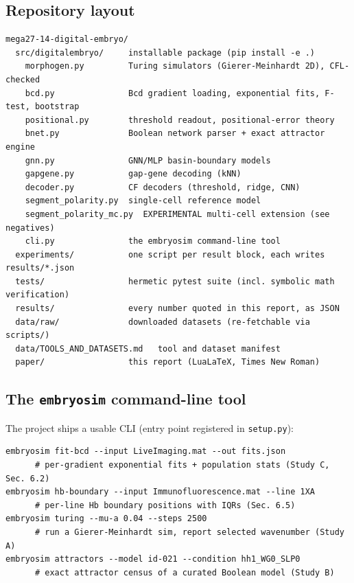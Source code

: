 \label{sec:repro}

\subsection{Repository layout}

\begin{verbatim}
mega27-14-digital-embryo/
  src/digitalembryo/     installable package (pip install -e .)
    morphogen.py         Turing simulators (Gierer-Meinhardt 2D), CFL-checked
    bcd.py               Bcd gradient loading, exponential fits, F-test, bootstrap
    positional.py        threshold readout, positional-error theory
    bnet.py              Boolean network parser + exact attractor engine
    gnn.py               GNN/MLP basin-boundary models
    gapgene.py           gap-gene decoding (kNN)
    decoder.py           CF decoders (threshold, ridge, CNN)
    segment_polarity.py  single-cell reference model
    segment_polarity_mc.py  EXPERIMENTAL multi-cell extension (see negatives)
    cli.py               the embryosim command-line tool
  experiments/           one script per result block, each writes results/*.json
  tests/                 hermetic pytest suite (incl. symbolic math verification)
  results/               every number quoted in this report, as JSON
  data/raw/              downloaded datasets (re-fetchable via scripts/)
  data/TOOLS_AND_DATASETS.md   tool and dataset manifest
  paper/                 this report (LuaLaTeX, Times New Roman)
\end{verbatim}

\subsection{The \texttt{embryosim} command-line tool}

The project ships a usable CLI (entry point registered in \texttt{setup.py}):

\begin{verbatim}
embryosim fit-bcd --input LiveImaging.mat --out fits.json
      # per-gradient exponential fits + population stats (Study C, Sec. 6.2)
embryosim hb-boundary --input Immunofluorescence.mat --line 1XA
      # per-line Hb boundary positions with IQRs (Sec. 6.5)
embryosim turing --mu-a 0.04 --steps 2500
      # run a Gierer-Meinhardt sim, report selected wavenumber (Study A)
embryosim attractors --model id-021 --condition hh1_WG0_SLP0
      # exact attractor census of a curated Boolean model (Study B)
\end{verbatim}

